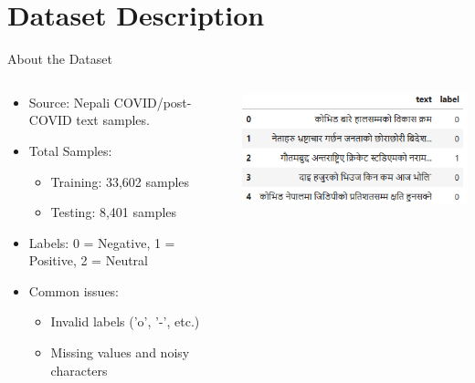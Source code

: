 \documentclass[aspectratio=169]{beamer}
\begin{document}
\section{Dataset Description}
\begin{frame}{About the Dataset}
  \begin{columns}[T]
    \begin{column}{0.5\textwidth}
      \begin{itemize}
        \item Source: Nepali COVID/post-COVID text samples.
        \item Total Samples:
              \begin{itemize}
                \item Training: 33,602 samples
                \item Testing: 8,401 samples
              \end{itemize}
        \item Labels: 0 = Negative, 1 = Positive, 2 = Neutral
        \item Common issues:
              \begin{itemize}
                \item Invalid labels ('o', '-', etc.)
                \item Missing values and noisy characters
              \end{itemize}
      \end{itemize}
    \end{column}
    
    \begin{column}{0.45\textwidth}
    \centering
      \includegraphics[width=\textwidth]{DataSample.png}
    \end{column}
  \end{columns}
\end{frame}
\end{document}
